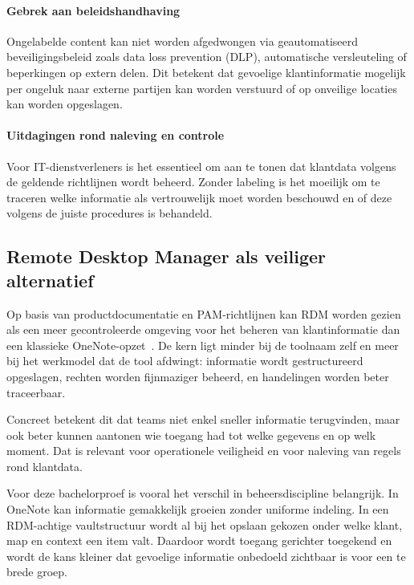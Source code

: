 \paragraph{Gebrek aan beleidshandhaving}
Ongelabelde content kan niet worden afgedwongen via geautomatiseerd beveiligingsbeleid zoals data loss prevention (DLP), automatische versleuteling of beperkingen op extern delen.
Dit betekent dat gevoelige klantinformatie mogelijk per ongeluk naar externe partijen kan worden verstuurd of op onveilige locaties kan worden opgeslagen.

\paragraph{Uitdagingen rond naleving en controle}
Voor IT-dienstverleners is het essentieel om aan te tonen dat klantdata volgens de geldende richtlijnen wordt beheerd.
Zonder labeling is het moeilijk om te traceren welke informatie als vertrouwelijk moet worden beschouwd en of deze volgens de juiste procedures is behandeld.

\subsection{Remote Desktop Manager als veiliger alternatief}
\label{subsec:rdm-veiliger-alternatief}

Op basis van productdocumentatie en PAM-richtlijnen kan RDM worden gezien als een meer gecontroleerde omgeving voor het beheren van klantinformatie dan een klassieke OneNote-opzet~\autocite{devolutions2025rdm,souppaya2021pam}. De kern ligt minder bij de toolnaam zelf en meer bij het werkmodel dat de tool afdwingt: informatie wordt gestructureerd opgeslagen, rechten worden fijnmaziger beheerd, en handelingen worden beter traceerbaar.

Concreet betekent dit dat teams niet enkel sneller informatie terugvinden, maar ook beter kunnen aantonen wie toegang had tot welke gegevens en op welk moment. Dat is relevant voor operationele veiligheid en voor naleving van regels rond klantdata.

Voor deze bachelorproef is vooral het verschil in beheersdiscipline belangrijk. In \mbox{OneNote} kan informatie gemakkelijk groeien zonder uniforme indeling. In een RDM-achtige vaultstructuur wordt al bij het opslaan gekozen onder welke klant, map en context een item valt. Daardoor wordt toegang gerichter toegekend en wordt de kans kleiner dat gevoelige informatie onbedoeld zichtbaar is voor een te brede groep.

